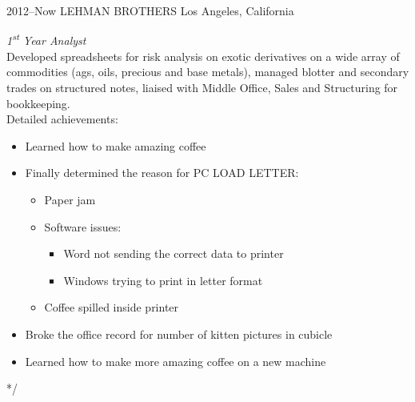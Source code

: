 \documentclass[]{friggeri-cv} %
\begin{document}
\begin{entrylist}
	

\entry
{2012--Now}
{LEHMAN BROTHERS}
{Los Angeles, California}
{\emph{1\textsuperscript{st} Year Analyst} \\
	Developed spreadsheets for risk analysis on exotic derivatives on a wide array of commodities (ags, oils, precious and base metals), managed blotter and secondary trades on structured notes, liaised with Middle Office, Sales and Structuring for bookkeeping. \\
	Detailed achievements:
	\begin{itemize}
		\item Learned how to make amazing coffee
		\item Finally determined the reason for \textsc{PC LOAD LETTER}:
		\begin{itemize}
			\item Paper jam
			\item Software issues:
			\begin{itemize}
				\item Word not sending the correct data to printer
				\item Windows trying to print in letter format
			\end{itemize}
			\item Coffee spilled inside printer
		\end{itemize}
		\item Broke the office record for number of kitten pictures in cubicle
		\item Learned how to make more amazing coffee on a new machine
	\end{itemize}}
	
	
\end{entrylist}

*/ 

\end{document}
